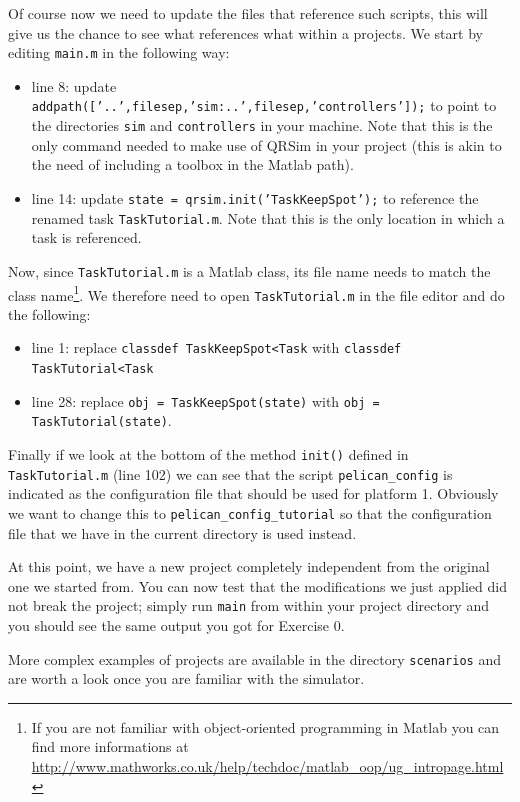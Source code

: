 \documentclass[a4paper,11pt]{article}
\begin{document}
Of course now we need to update the files that reference such scripts, this will give us the chance to see what references what within a projects.
We start by editing \texttt{main.m} in the following way:
\begin{itemize}
 \item line 8: update \texttt{addpath(['..',filesep,'sim:..',filesep,'controllers']);} to point to the directories \texttt{sim} and \texttt{controllers} in your machine. Note that this is the only command needed to make use of QRSim in your project (this is akin to the need of including a toolbox in the Matlab path).
 \item line 14: update \texttt{state = qrsim.init('TaskKeepSpot');} to reference the renamed task \texttt{TaskTutorial.m}. Note that this is the only location in which a task is referenced.
\end{itemize}  
Now, since \texttt{TaskTutorial.m} is a Matlab class, its file name needs to match the class name\footnote{If you are not familiar with object-oriented programming in Matlab you can find more informations at \url{http://www.mathworks.co.uk/help/techdoc/matlab_oop/ug_intropage.html}}. We therefore need to open \texttt{TaskTutorial.m} in the file editor and do the following:
\begin{itemize}
 \item line 1: replace \texttt{classdef TaskKeepSpot<Task} with \texttt{classdef TaskTutorial<Task}
 \item line 28: replace \texttt{obj = TaskKeepSpot(state)} with \texttt{obj = TaskTutorial(state)}.
\end{itemize}
Finally if we look at the bottom of the method \texttt{init()} defined in \texttt{TaskTutorial.m} (line 102) we can see that the script \texttt{pelican\_config} is indicated as the configuration file that should be used for platform 1. Obviously we want to change this to \texttt{pelican\_config\_tutorial} so that the configuration file that we have in the current directory is used instead.

At this point, we have a new project completely independent from the original one we started from. You can now test that the modifications we just applied did not break the project; simply run \texttt{main} from within your project directory and you should see the same output you got for Exercise 0. 

More complex examples of projects are available in the directory \texttt{scenarios} and are worth a look once you are familiar with the simulator.
\end{document}
